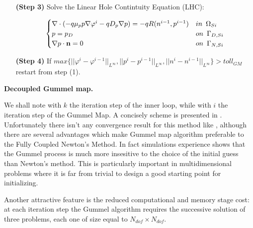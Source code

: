 {\begin{itemize}
\item[\bf (Step 3)] Solve the Linear Hole Contintuity Equation (LHC):

\begin{equation}
\label{eq: LHC system}
\begin{cases}
\nabla \cdot (- q\mu_p p \nabla \varphi^i - qD_p \nabla p ) =  -qR(n^{i-1},p^{i-1}) & in \psp{3} \Omega_{Si}
\\
 p = p_D & on \psp{3} \Gamma_{D,Si}
 \\
 \nabla p \cdot \vect{n} = 0 & on \psp{3} \Gamma_{N,Si}
\end{cases}
\end{equation}

\item[\bf (Step 4)] If $max\{||\varphi^i-\varphi^{i-1}||_{L^{\infty}},||p^i-p^{i-1}||_{L^{\infty}},||n^i-n^{i-1}||_{L^{\infty}}\}>toll_{GM}$ restart from step (1).


\end{itemize}

}{\textbf{Decoupled Gummel map.}}

We shall note with $k$ the iteration step of the inner loop, while with $i$ the iteration step of the Gummel Map. A concisely scheme is presented in .
Unfortunately there isn't any convergence result for this method like , although there are several advantages which make Gummel map algorithm preferable to the Fully Coupled Newton's Method.
In fact simulations experience shows that the Gummel process is much more insesitive to the choice of the initial guess than Newton's method. This is particularly important in multidimensional problems where it is far from trivial to design a good starting point for initializing.

Another attractive feature is the reduced computational and memory stage cost: at each iteration step the Gummel algorithm requires the successive solution of three problems, each one of size equal to $N_{dof}\times N_{dof}$.





